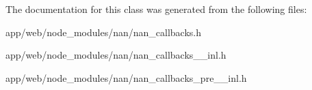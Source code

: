 The documentation for this class was generated from the following files\+:\begin{DoxyCompactItemize}
\item 
app/web/node\+\_\+modules/nan/nan\+\_\+callbacks.\+h\item 
app/web/node\+\_\+modules/nan/nan\+\_\+callbacks\+\_\+\_\+inl.\+h\item 
app/web/node\+\_\+modules/nan/nan\+\_\+callbacks\+\_\+pre\+\_\+\_\+inl.\+h\end{DoxyCompactItemize}
